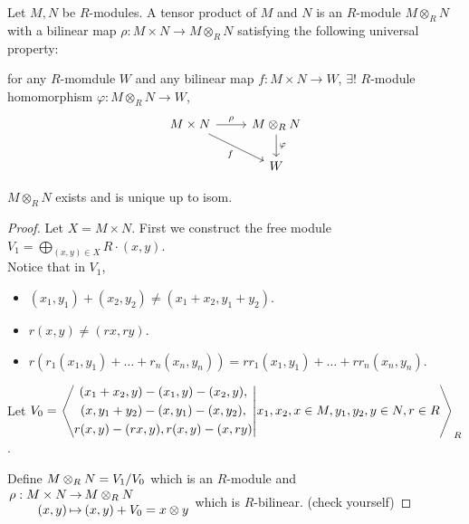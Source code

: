 \begin{definition}
  Let $M, N$ be $R$-modules. A tensor product of $M$ and $N$ is an $R$-module
  $M \otimes_R N$ with a bilinear map $\rho: M\times N \to M\otimes_R N$
  satisfying the following universal property:

  for any $R$-momdule $W$ and any bilinear map $f: M\times N \to W$,
  $\exists!$ $R$-module homomorphism $\varphi: M \otimes_R N \to W$,
  \[
    \begin{tikzcd}
    M\times N \arrow{r}{\rho} \arrow[swap]{dr}{f}
      & M \otimes_R N \arrow{d}{\varphi} \\
    & W
    \end{tikzcd}
  \]
\end{definition}

\begin{theorem}
  $M \otimes_R N$ exists and is unique up to isom.
  \begin{proof}
    Let $X = M\times N$.
    First we construct the free module
    $\displaystyle V_1 = \bigoplus_{(x, y) \in X} R \cdot (x, y)$. \\
    Notice that in $V_1$,
    \begin{itemize}
      \item $(x_1, y_1) + (x_2, y_2) \ne (x_1+x_2, y_1+y_2)$.
      \item $r(x, y) \ne (rx, ry)$.
      \item $r(r_1(x_1, y_1) + \dots + r_n(x_n, y_n)) =
        rr_1(x_1, y_1) + \dots + rr_n(x_n, y_n)$.
    \end{itemize}
    Let $V_0 = \gen*{
      \begin{gathered}
        (x_1+x_2, y) - (x_1, y) - (x_2, y), \\
        (x, y_1+y_2) - (x, y_1) - (x, y_2), \\
        r(x, y) - (rx, y), r(x, y) - (x, ry)
      \end{gathered}
      \middle| x_1, x_2, x \in M, y_1, y_2, y \in N, r \in R
    }_R$.

    Define $M \otimes_R N = \quot{V_1}{V_0}$ which is an $R$-module and
    $\arraycolsep=1pt
    \begin{array}{rcl}
      \rho: M \times N & \to & M \otimes_R N \\
      (x, y) & \mapsto & (x, y) + V_0 = x \otimes y
    \end{array}$
    which is $R$-bilinear. (check yourself)


\end{proof}
\end{theorem}
